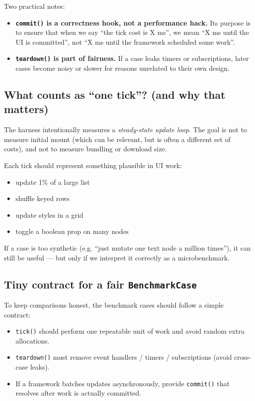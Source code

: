 Two practical notes:

\begin{itemize}
\item \textbf{\texttt{commit()} is a correctness hook, not a performance hack.} Its purpose is to ensure that when we say ``the tick cost is X ms'', we mean ``X ms until the UI is committed'', not ``X ms until the framework scheduled some work''.
\item \textbf{\texttt{teardown()} is part of fairness.} If a case leaks timers or subscriptions, later cases become noisy or slower for reasons unrelated to their own design.
\end{itemize}

\subsection{What counts as ``one tick''? (and why that matters)}

The harness intentionally measures a \emph{steady-state update loop}.
The goal is not to measure initial mount (which can be relevant, but is often a different set of costs), and not to measure bundling or download size.

Each tick should represent something plausible in UI work:

\begin{itemize}
\item update 1\% of a large list
\item shuffle keyed rows
\item update styles in a grid
\item toggle a boolean prop on many nodes
\end{itemize}

If a case is too synthetic (e.g. ``just mutate one text node a million times''), it can still be useful --- but only if we interpret it correctly as a microbenchmark.

\subsection{Tiny contract for a fair \texttt{BenchmarkCase}}

To keep comparisons honest, the benchmark cases should follow a simple contract:

\begin{itemize}
\item \texttt{tick()} should perform one repeatable unit of work and avoid random extra allocations.
\item \texttt{teardown()} must remove event handlers / timers / subscriptions (avoid cross-case leaks).
\item If a framework batches updates asynchronously, provide \texttt{commit()} that resolves after work is actually committed.
\end{itemize}

